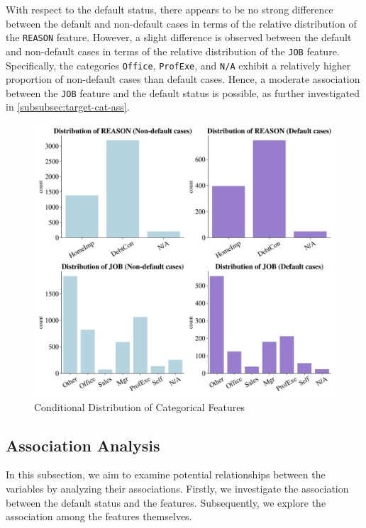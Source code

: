 With respect to the default status, there appears to be no strong difference between the default and non-default cases in terms of the relative distribution of the \texttt{REASON} feature.
However, a slight difference is observed between the default and non-default cases in terms of the relative distribution of the \texttt{JOB} feature.
Specifically, the categories \texttt{Office}, \texttt{ProfExe}, and \texttt{N/A} exhibit a relatively higher proportion of non-default cases than default cases.
Hence, a moderate association between the \texttt{JOB} feature and the default status is possible, as further investigated in \autoref{subsubsec:target-cat-ass}.



\begin{figure}[H]
\centering
\caption{Conditional Distribution of Categorical Features}\vspace{0.5em}
\label{fig:catdist}
\includegraphics[width=140mm]{Figures/Categorical_Features_Distribution.jpg}

\vspace{-1em}
\end{figure}
\subsection{Association Analysis}
\label{subsec:assanal}
In this subsection, we aim to examine potential relationships between the variables by analyzing their associations. Firstly, we investigate the association between the default status and the features. Subsequently, we explore the association among the features themselves.

